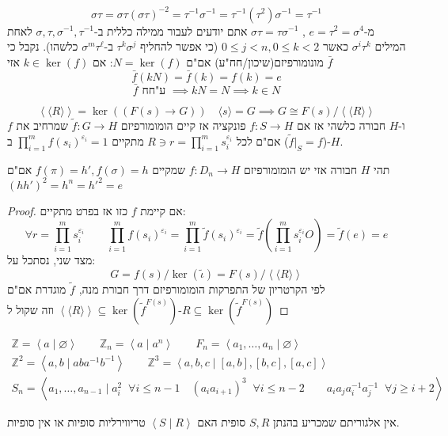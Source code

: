 \documentclass{tstextbook}
\begin{document}
$$\sigma \tau=\sigma \tau\left( \sigma \tau \right)^{-2}=\tau ^{-1} \sigma ^{-1} =\tau ^{-1} \left( \tau^2 \right)\sigma ^{-1} =\tau ^{-1}$$
מ-\(e=\tau^2=\sigma^4\) , \(\sigma \tau=\tau \sigma ^{-1}\) אתם יודעים לעבור ממילה כללית ב-\(\sigma ,\tau,\sigma ^{-1} ,\tau ^{-1}\) לאחת המילים \(\sigma^i\tau^k\) כאשר \(0\leq j<n,0\leq k<2\) (כי אפשר להחליף \(\tau^k \sigma^j\) ב-\(\sigma^m\tau^\ell\) כלשהו).
נקבל כי \(\bar{f}\) מונומורפיזם(שיכון/חח"ע) אם"ם \(N=\ker(f)\): אם \(k\in \ker(f)\) אזי $$\bar{f}(kN)=\bar{f}(k)=f(k)=e$$$$\bar{f} \text{ ע"חח } \implies kN=N\implies k\in N$$

\begin{proposition}
$$\left\langle  \langle R\rangle  \right\rangle =\ker\left( \left( F(s)\to G \right) \right) \quad \langle s\rangle =G\implies G\cong F(s) / \left\langle  \langle R\rangle  \right\rangle$$
ו-\(H\) חבורה כלשהי אז אם \(f:S\to H\) פונקציה אז קיים הומומורפיזם \(\tilde{f}:G\to H\) שמרחיב את \(f\) (\(\tilde{f}|_{S}=f\)) אם"ם לכל \(R\ni r=\prod_{i=1}^m s_{i}^{\varepsilon_{i}}\) מתקיים \(\prod_{i=1}^mf(s_{i})^{\varepsilon_{i}}=1\) ב-\(H\).

\end{proposition}
\begin{example}
תהי \(H\) חבורה אזי יש הומומורפיזם \(f:D_{n}\to H\) שמקיים \(f\left( \pi \right)=h', f\left( \sigma \right)=h\) אם"ם \((hh')^2=h^n=h'^2=e\)

\end{example}
\begin{proof}
אם קיימת \(f\) כזו אז בפרט מתקיים:
$$\forall r=\prod_{i=1}^m s_{i}^{\varepsilon_{i}}\qquad \prod_{i=1}^{m}f(s_{i})^{\varepsilon_{i}}=\prod_{i=1}^{m}\tilde{f}(s_{i})^{\varepsilon_{i}}=\tilde{f}\left( \prod_{i=1}^{m}s_{i}^{\varepsilon_{i}}O \right)=\tilde{f}(e)=e$$
מצד שני, נסתכל על:
$$G= f(s) / \ker\left( \tilde{\iota} \right)=F(s) / \left\langle  \langle R\rangle  \right\rangle$$
לפי הקרטריון של התפרקות הומומורפיזם דרך חבורת מנה, \(\tilde{f}\) מוגדרת אם"ם \(\left\langle  \langle R\rangle  \right\rangle\subseteq \ker\left( \tilde{f}^{F(s)} \right)\)
וזה שקול ל-\(R\subseteq \ker\left( \tilde{f}^{F(s)} \right)\)

\end{proof}
\begin{example}
$$\begin{gathered}\mathbb{Z} =\left\langle  a\mid \varnothing\right\rangle \qquad \mathbb{Z} _{n}=\left\langle  a\mid a^n \right\rangle \qquad F_{n}=\left\langle  a_{1},\dots,a_{n}\mid \varnothing\right\rangle \\ \mathbb{Z} ^2=\left\langle  a,b\mid aba^{-1} b^{-1}  \right\rangle  \qquad \mathbb{Z}^3=\left\langle  a,b,c\mid[a,b],[b,c],[a,c] \right\rangle   \\S_{n}=\left\langle  a_{1},\dots,a_{n-1}\mid a_{i}^2 \;\;\forall i\leq n-1\quad (a_{i}a_{i+1})^3\;\;\forall i\leq n-2\qquad a_{i}a_{j}a_{i}^{-1} a_{j}^{-1}\;\; \forall j\geq i+2 \right\rangle
\end{gathered}$$

\end{example}
\begin{remark}
אין אלגוריתם שמכריע בהנתן \(S,R\) סופית האם \(\left\langle  S\mid R  \right\rangle\) טריווירליות סופיות או אין סופיות.

\end{remark}
\end{document}
